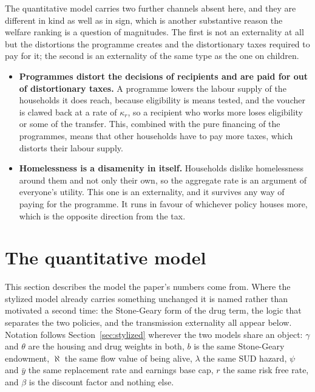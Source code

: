 \documentclass[10pt]{article}
\begin{document}
The quantitative model carries two further channels absent here, and
they are different in kind as well as in sign, which is another substantive reason
the welfare ranking is a question of magnitudes. The first is not an externality at
all but the distortions the programme creates and the distortionary taxes
required to pay for it; the second is an externality of the
same type as the one on children.

\begin{itemize}\setlength{\itemsep}{0.15em}
\item \textbf{Programmes distort the decisions of recipients and are
paid for out of distortionary taxes.} A programme lowers the labour supply of the households it
does reach, because eligibility is means tested, and the voucher is clawed back at a
rate of $\kappa_r$, so a recipient who works more loses eligibility or
some of the transfer.
This, combined with the pure financing of the programmes, means that other
households have to pay more taxes, which
distorts their labour supply.

\item \textbf{Homelessness is a disamenity in itself.} Households dislike
homelessness around them and not only their own, so the aggregate rate is an
argument of everyone's utility. This one is an externality, and it
survives any way of paying for the programme. It runs in favour of whichever policy houses
more, which is the opposite direction from the tax.
\end{itemize}



\section{The quantitative model}\label{sec:full}

This section describes the model the paper's numbers come from. Where
the stylized model already carries something unchanged it is named rather than
motivated a second time: the Stone-Geary form of the drug term, the logic that
separates the two policies, and the transmission externality all appear below.
Notation follows Section~\ref{sec:stylized} wherever the two models share an
object: $\gamma$ and $\theta$ are the housing and drug weights in both, $b$ is the
same Stone-Geary endowment, $\aleph$ the same flow value of being alive, $\lambda$
the same SUD hazard, $\psi$ and $\bar y$ the same replacement rate and
earnings base cap, $r$ the same risk free rate, and $\beta$ is the discount
factor and nothing else.
\end{document}
